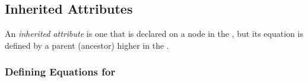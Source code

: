 \subsection{Inherited Attributes}\label{subsec:Inherited_Attributes}
\begin{definition}\label{def:Inherited_Attribute}
  An \emph{inherited attribute} is one that is declared on a node in the , but its equation is defined by a parent (ancestor) higher in the .
\end{definition}

\subsubsection{Defining Equations for }\label{subsubsec:Define_Inherited_Equations}

